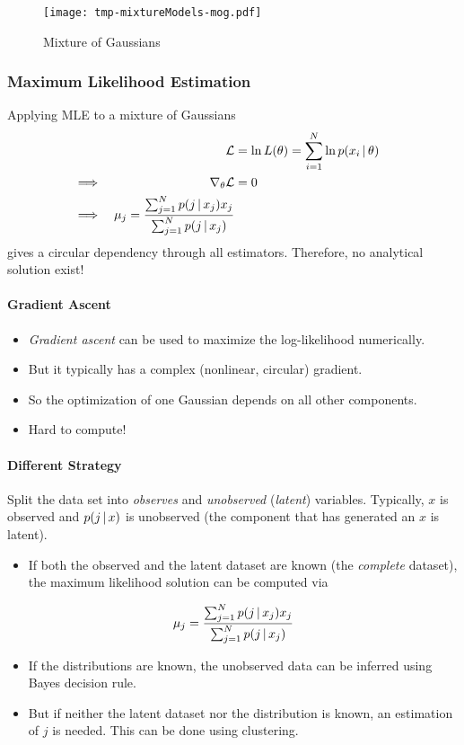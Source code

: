 			\begin{figure}
				\centering
				\texttt{[image: tmp-mixtureModels-mog.pdf]}
				\caption{Mixture of Gaussians}
				\label{fig:mog}
			\end{figure}

			\subsubsection{Maximum Likelihood Estimation}
				Applying MLE to a mixture of Gaussians
				\begin{align}
					&& \mathcal{L} &= \ln L(\theta) = \sum_{i = 1}^{N} \ln p(x_i \,\vert\, \theta) & \\
					\implies && \nabla_\theta \mathcal{L} &= 0 & \\
					\implies && \mu_j = \frac{\sum_{j = 1}^{N} p(j \,\vert\, x_j) x_j}{\sum_{j = 1}^{N} p(j \,\vert\, x_j)}
				\end{align}
				gives a circular dependency through all estimators. Therefore, no analytical solution exist!

				\paragraph{Gradient Ascent}
					\begin{itemize}
						\item \emph{Gradient ascent} can be used to maximize the log-likelihood numerically.
						\item But it typically has a complex (nonlinear, circular) gradient.
						\item So the optimization of one Gaussian depends on all other components.
						\item Hard to compute!
					\end{itemize}

				\paragraph{Different Strategy}
					Split the data set into \emph{observes} and \emph{unobserved} (\emph{latent}) variables. Typically, \(x\) is observed and \(p(j \,\vert\, x)\) is unobserved (the component that has generated an \(x\) is latent).

					\begin{itemize}
						\item If both the observed and the latent dataset are known (the \emph{complete} dataset), the maximum likelihood solution can be computed via
					\end{itemize}
					\begin{equation}
						\mu_j = \frac{\sum_{j = 1}^{N} p(j \,\vert\, x_j) x_j}{\sum_{j = 1}^{N} p(j \,\vert\, x_j)}
					\end{equation}
					\begin{itemize}
						\item If the distributions are known, the unobserved data can be inferred using Bayes decision rule.
						\item But if neither the latent dataset nor the distribution is known, an estimation of \(j\) is needed. This can be done using clustering.
					\end{itemize}

